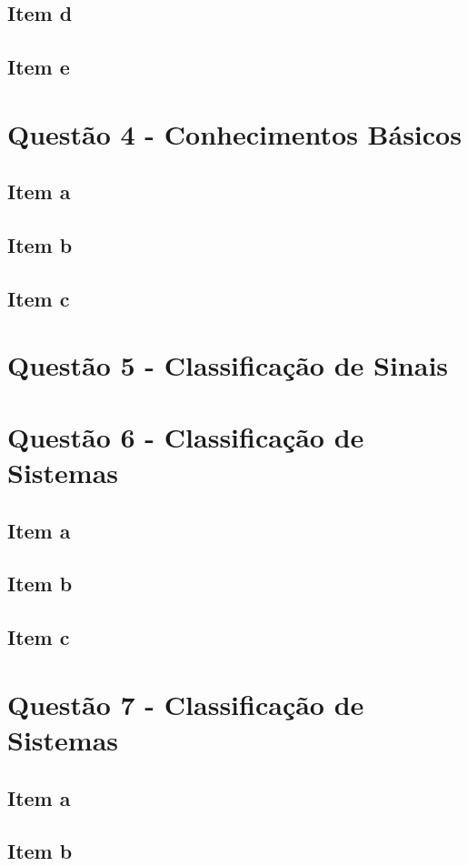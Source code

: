 \documentclass[a4paper, 12pt]{article}
\begin{document}
		\subsection{Item d}	
		\subsection{Item e}	
	\section{Quest\~{a}o 4 - Conhecimentos Básicos}
		\subsection{Item a}	
		\subsection{Item b}	
		\subsection{Item c}	
	\section{Quest\~{a}o 5 - Classificação de Sinais}		
	\section{Quest\~{a}o 6 - Classificação de Sistemas}			
		\subsection{Item a}	
		\subsection{Item b}	
		\subsection{Item c}		
	\section{Quest\~{a}o 7 - Classificação de Sistemas}			
		\subsection{Item a}	
		\subsection{Item b}			
\end{document}
